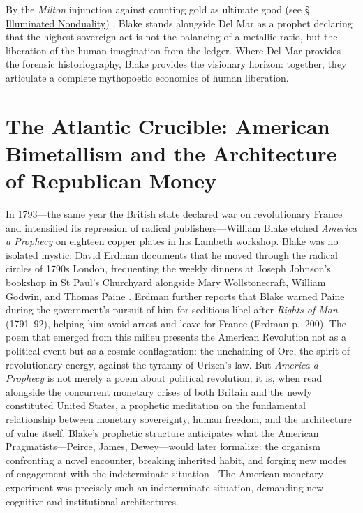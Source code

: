 \documentclass[
]{article}
\begin{document}
By the \emph{Milton} injunction against counting gold as ultimate good
(see \hyperref[sec-illuminated-nonduality]{§ Illuminated Nonduality})
\citep{erdman1988complete}, Blake stands alongside Del Mar as a prophet
declaring that the highest sovereign act is not the balancing of a
metallic ratio, but the liberation of the human imagination from the
ledger. Where Del Mar provides the forensic historiography, Blake
provides the visionary horizon: together, they articulate a complete
mythopoetic economics of human liberation.

\newpage

\section{The Atlantic Crucible: American Bimetallism and the
Architecture of Republican
Money}\label{the-atlantic-crucible-american-bimetallism-and-the-architecture-of-republican-money}

In 1793---the same year the British state declared war on revolutionary
France and intensified its repression of radical publishers---William
Blake etched \emph{America a Prophecy} on eighteen copper plates in his
Lambeth workshop. Blake was no isolated mystic: David Erdman documents
that he moved through the radical circles of 1790s London, frequenting
the weekly dinners at Joseph Johnson's bookshop in St Paul's Churchyard
alongside Mary Wollstonecraft, William Godwin, and Thomas Paine
\citep{erdman1954prophet}. Erdman further reports that Blake warned
Paine during the government's pursuit of him for seditious libel after
\emph{Rights of Man} (1791--92), helping him avoid arrest and leave for
France (Erdman p.~200). The poem that emerged from this milieu presents
the American Revolution not as a political event but as a cosmic
conflagration: the unchaining of Orc, the spirit of revolutionary
energy, against the tyranny of Urizen's law. But \emph{America a
Prophecy} is not merely a poem about political revolution; it is, when
read alongside the concurrent monetary crises of both Britain and the
newly constituted United States, a prophetic meditation on the
fundamental relationship between monetary sovereignty, human freedom,
and the architecture of value itself. Blake's prophetic structure
anticipates what the American Pragmatists---Peirce, James, Dewey---would
later formalize: the organism confronting a novel encounter, breaking
inherited habit, and forging new modes of engagement with the
indeterminate situation \citep{friedman2026blake, friedman2026doors}.
The American monetary experiment was precisely such an indeterminate
situation, demanding new cognitive and institutional architectures.
\end{document}
